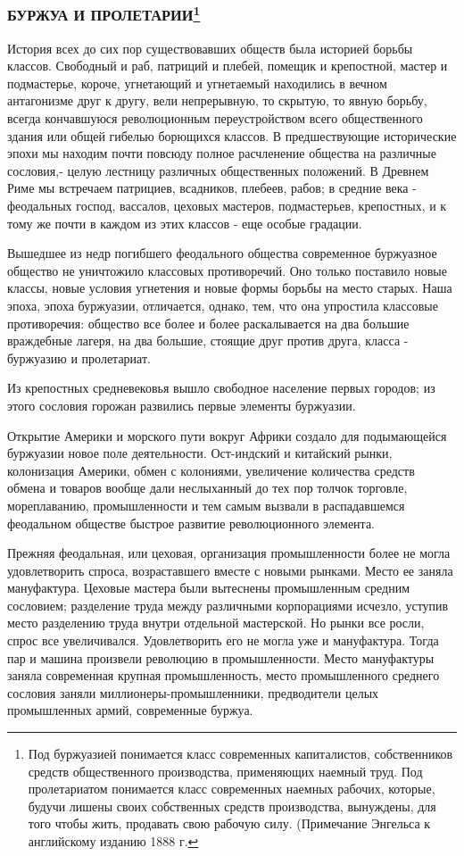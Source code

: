 \documentclass[12pt]{article}
\newcommand{\parnum}{(\arabic{parcount})}
\newcounter{parcount}
\newenvironment{parnumbers}{%
  \par%
  \everypar{\noindent \stepcounter{parcount}\marginpar[]{\parnum}}%
}{}
\begin{document}
\subsubsection*{БУРЖУА И ПРОЛЕТАРИИ\footnote{Под буржуазией понимается класс современных капиталистов, собственников средств общественного производства, применяющих наемный труд. Под пролетариатом понимается класс современных наемных рабочих, которые, будучи лишены своих собственных средств производства, вынуждены, для того чтобы жить, продавать свою рабочую силу. (Примечание Энгельса к английскому изданию 1888 г.}}
\begin{parnumbers}
    История всех до сих пор существовавших обществ была историей борьбы классов. Свободный и раб, патриций и плебей, помещик и крепостной, мастер и подмастерье, короче, угнетающий и угнетаемый находились в вечном антагонизме друг к другу, вели непрерывную, то скрытую, то явную борьбу, всегда кончавшуюся революционным переустройством всего общественного здания или общей гибелью борющихся классов. В предшествующие исторические эпохи мы находим почти повсюду полное расчленение общества на различные сословия,- целую лестницу различных общественных положений. В Древнем Риме мы встречаем патрициев, всадников, плебеев, рабов; в средние века - феодальных господ, вассалов, цеховых мастеров, подмастерьев, крепостных, и к тому же почти в каждом из этих классов - еще особые градации.

    Вышедшее из недр погибшего феодального общества современное буржуазное общество не уничтожило классовых противоречий. Оно только поставило новые классы, новые условия угнетения и новые формы борьбы на место старых. Наша эпоха, эпоха буржуазии, отличается, однако, тем, что она упростила классовые противоречия: общество все более и более раскалывается на два большие враждебные лагеря, на два большие, стоящие друг против друга, класса - буржуазию и пролетариат.

    Из крепостных средневековья вышло свободное население первых городов; из этого сословия горожан развились первые элементы буржуазии.

    Открытие Америки и морского пути вокруг Африки создало для подымающейся буржуазии новое поле деятельности. Ост-индский и китайский рынки, колонизация Америки, обмен с колониями, увеличение количества средств обмена и товаров вообще дали неслыханный до тех пор толчок торговле, мореплаванию, промышленности и тем самым вызвали в распадавшемся феодальном обществе быстрое развитие революционного элемента.

    Прежняя феодальная, или цеховая, организация промышленности более не могла удовлетворить спроса, возраставшего вместе с новыми рынками. Место ее заняла мануфактура. Цеховые мастера были вытеснены промышленным средним сословием; разделение труда между различными корпорациями исчезло, уступив место разделению труда внутри отдельной мастерской. Но рынки все росли, спрос все увеличивался. Удовлетворить его не могла уже и мануфактура. Тогда пар и машина произвели революцию в промышленности. Место мануфактуры заняла современная крупная промышленность, место промышленного среднего сословия заняли миллионеры-промышленники, предводители целых промышленных армий, современные буржуа.


\end{parnumbers}
\end{document}
